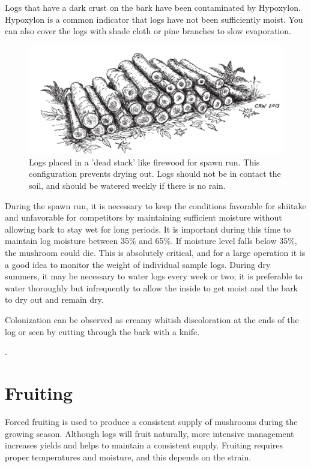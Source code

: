 \documentclass{tufte-handout}
\begin{document}
Logs that have a dark crust on the bark have been contaminated by Hypoxylon. 
Hypoxylon is a common indicator that logs have not been sufficiently moist.
You can also cover the logs with shade cloth or pine branches to slow evaporation.


\begin{figure}
\includegraphics{dead-stack}
\caption{Logs placed in a 'dead stack' like firewood for spawn run. This configuration prevents drying out. Logs should not be in contact the soil, and should be watered weekly if there is no rain.}
\end{figure}

During the spawn run, it is necessary to keep the conditions favorable for shiitake and unfavorable for competitors by maintaining sufficient moisture without allowing bark to stay wet for long periods. It is important during this time to maintain log moisture between 35\% and 65\%. 
If moisture level falls below 35\%, the mushroom could die.
This is absolutely critical, and for a large operation it is a good idea to monitor the weight of individual sample logs. 
During dry summers, it may be necessary to water logs every week or two; it is preferable to water thoroughly but infrequently to allow the inside to get moist and the bark to dry out and remain dry. 

Colonization can be observed as creamy whitish discoloration at the ends of the log or seen by cutting through the bark with a knife.

. 
\section{Fruiting}

Forced fruiting is used to produce a consistent supply of mushrooms during the growing season. 
Although logs will fruit naturally, more intensive management increases yields and helps to maintain a consistent supply. Fruiting requires proper temperatures and moisture, and this depends on the strain.
\end{document}
